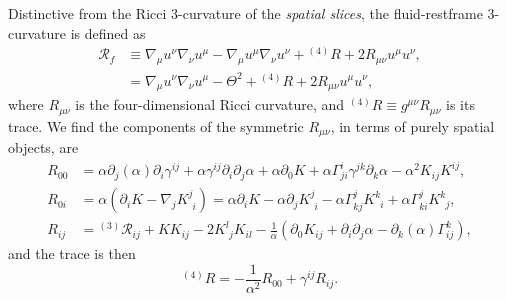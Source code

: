 \documentclass[a4paper]{article}
\newcommand{\ph}{\phantom}
\newcommand{\alp}{\alpha}
\newcommand{\Gam}{\Gamma}
\newcommand{\gam}{\gamma}
\newcommand{\pd}{\partial}
\begin{document}
Distinctive from the Ricci 3-curvature of the \emph{spatial slices}, the fluid-restframe 3-curvature \citep{Buchert2020} is defined as
\begin{align}
	\mathcal{R}_f &\equiv \nabla_\mu u^\nu \nabla_\nu u^\mu - \nabla_\mu u^\mu \nabla_\nu u^\nu + {}^{(4)}R + 2 R_{\mu\nu} u^\mu u^\nu, \\
	&= \nabla_\mu u^\nu \nabla_\nu u^\mu - \Theta^2 + {}^{(4)}R + 2 R_{\mu\nu} u^\mu u^\nu, \label{eq:fluidR_full}
\end{align}
where $R_{\mu\nu}$ is the four-dimensional Ricci curvature, and ${}^{(4)}R \equiv g^{\mu\nu} R_{\mu\nu}$ is its trace. We find the components of the symmetric $R_{\mu\nu}$, in terms of purely spatial objects, are
\begin{align}
	R_{00} &= \alp \pd_j (\alp) \pd_i \gam^{ij} + \alp \gam^{ij} \pd_i \pd_j \alp + \alp \pd_0 K + \alp \Gam^i_{ji} \gam^{jk}\pd_k \alp - \alp^2 K_{ij}K^{ij}, \\
	R_{0i} & = \alp \left( \pd_i K - \nabla_j K^j_{\ph{j}i} \right) = \alp \pd_i K - \alp \pd_j K^j_{\ph{j}i} - \alp \Gam^j_{kj} K^k_{\ph{k}i} + \alp \Gam^j_{ki} K^k_{\ph{k}j}, \\
	R_{ij} &= {}^{(3)}\mathcal{R}_{ij} + K K_{ij} - 2 K^l_{\ph{l}j} K_{il} - \frac{1}{\alp} \left( \pd_0 K_{ij} + \pd_i \pd_j \alp - \pd_k (\alp) \Gam^k_{ij} \right),
\end{align}
and the trace is then
\begin{equation}
	{}^{(4)}R = - \frac{1}{\alp^2} R_{00} + \gam^{ij} R_{ij}.
\end{equation}
\end{document}
